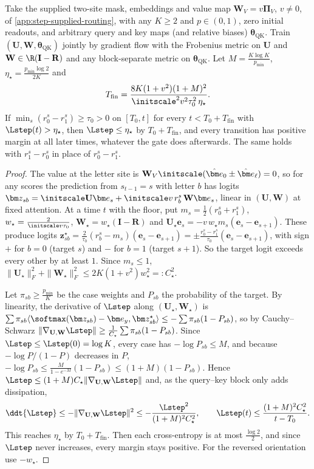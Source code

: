 \begin{lemma}
\label{lem:gate-floor-completion}
Take the supplied two-site mask, embeddings and value map $\mathbf W_V=v\bm\Pi_V$, $v\ne0$, of \cref{app:step-supplied-routing}, with any $K\ge2$ and
$p\in(0,1)$, zero initial readouts, and arbitrary query and key maps (and relative biases) $\bm\theta_{\mathrm{QK}}$. Train $(\mathbf U,\mathbf W,\bm\theta_{\mathrm{QK}})$
jointly by gradient flow with the Frobenius metric on $\mathbf U$ and $\mathbf W\in\R(\mathbf I-\mathbf R)$ and any block-separate metric on
$\bm\theta_{\mathrm{QK}}$. Let $M=\frac{K\log K}{p_{\min}}$, $\eta_\star=\frac{p_{\min}\log2}{2K}$ and
\[
 T_{\mathrm{fin}}=\frac{8K(1+v^2)(1+M)^2}{\initscale^2v^2\tau_0^2\,\eta_\star}.
\]
If $\min_s(r^s_0-r^s_1)\ge\tau_0>0$ on $[T_0,t]$ for every $t<T_0+T_{\mathrm{fin}}$ with $\Lstep(t)>\eta_\star$, then $\Lstep\le\eta_\star$ by $T_0+T_{\mathrm{fin}}$,
and every transition has positive margin at all later times, whatever the gate does afterwards. The same holds with $r^s_1-r^s_0$ in place of
$r^s_0-r^s_1$.
\end{lemma}

\begin{proof}
The value at the letter site is $\mathbf W_V\initscale(\hat{\bm e}_0\pm\hat{\bm e}_\ell)=0$, so for any scores the prediction from $s_{t-1}=s$ with letter $b$ has logits
$\bm z_{sb}=\initscale\mathbf U\bm e_s+\initscale v\,r^s_b\,\mathbf W\bm e_s$, linear in $(\mathbf U,\mathbf W)$ at fixed attention.
At a time $t$ with the floor, put $m_s=\frac12(r^s_0+r^s_1)$, $w_\star=\frac{2}{\initscale v\tau_0}$, $\mathbf W_\star=w_\star(\mathbf I-\mathbf R)$ and
$\mathbf U_\star\bm e_s=-v\,w_\star m_s(\bm e_s-\bm e_{s+1})$. These produce logits
$\bm z^\star_{sb}=\frac{2}{\tau_0}(r^s_b-m_s)(\bm e_s-\bm e_{s+1})=\pm\frac{r^s_0-r^s_1}{\tau_0}(\bm e_s-\bm e_{s+1})$, with sign $+$ for $b=0$ (target $s$) and $-$
for $b=1$ (target $s+1$). So the target logit exceeds every other by at least $1$. Since $m_s\le1$,
$\|\mathbf U_\star\|_F^2+\|\mathbf W_\star\|_F^2\le2K(1+v^2)w_\star^2=:C_\star^2$.

Let $\pi_{sb}\ge\frac{p_{\min}}K$ be the case weights and $P_{sb}$ the probability of the target. By linearity, the derivative of $\Lstep$ along
$(\mathbf U_\star,\mathbf W_\star)$ is $\sum\pi_{sb}\langle\softmax(\bm z_{sb})-\bm e_{y},\bm z^\star_{sb}\rangle\le-\sum\pi_{sb}(1-P_{sb})$, so by Cauchy--Schwarz
$\|\nabla_{\mathbf U,\mathbf W}\Lstep\|\ge\frac1{C_\star}\sum\pi_{sb}(1-P_{sb})$. Since $\Lstep\le\Lstep(0)=\log K$, every case has $-\log P_{sb}\le M$, and because
$-\log P/(1-P)$ decreases in $P$, $-\log P_{sb}\le\frac{M}{1-e^{-M}}(1-P_{sb})\le(1+M)(1-P_{sb})$. Hence $\Lstep\le(1+M)C_\star\|\nabla_{\mathbf U,\mathbf W}\Lstep\|$ and,
as the query--key block only adds dissipation,
\[
 \ddt{\Lstep}\le-\|\nabla_{\mathbf U,\mathbf W}\Lstep\|^2\le-\frac{\Lstep^2}{(1+M)^2C_\star^2},\qquad
 \Lstep(t)\le\frac{(1+M)^2C_\star^2}{t-T_0}.
\]
This reaches $\eta_\star$ by $T_0+T_{\mathrm{fin}}$. Then each cross-entropy is at most $\frac{\log2}2$, and since $\Lstep$ never increases, every margin stays
positive. For the reversed orientation use $-w_\star$.
\end{proof}

